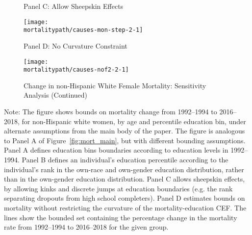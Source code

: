 \begin{figure}[H]\ContinuedFloat
  \caption{Change in non-Hispanic White Female Mortality: Sensitivity Analysis (Continued)} \thispagestyle{empty}
  \begin{center}
    \vspace{-.6cm} Panel C: Allow Sheepskin Effects
  \end{center}
  \begin{center}
    \texttt{[image: \\mortalitypath/causes-mon-step-2-1]} \\
  \end{center}

  \begin{center}
    \vspace{-.6cm} Panel D: No Curvature Constraint
  \end{center}
  \begin{center}
    \texttt{[image: \\mortalitypath/causes-nof2-2-1]} \\
  \end{center}
\end{figure}
\vspace{-1cm} \tiny{Note: The figure shows bounds on mortality change from 1992--1994 to 2016--2018, for non-Hispanic white women, by age and percentile education bin, under alternate assumptions from the main body of the paper. The figure is analogous to Panel A of Figure~\ref{fig:mort_main}, but with different bounding assumptions. Panel A defines education bins boundaries according to education levels in 1992--1994. Panel B defines an individual's education percentile according to the individual's rank in the own-race and own-gender education distribution, rather than in the own-gender education distribution. Panel C allows sheepskin effects, by allowing kinks and discrete jumps at education boundaries (e.g. the rank separating dropouts from high school completers). Panel D estimates bounds on mortality without restricting the curvature of the mortality-education CEF. The lines show the bounded set containing the percentage change in the mortality rate from 1992--1994 to 2016--2018 for the given group.}

